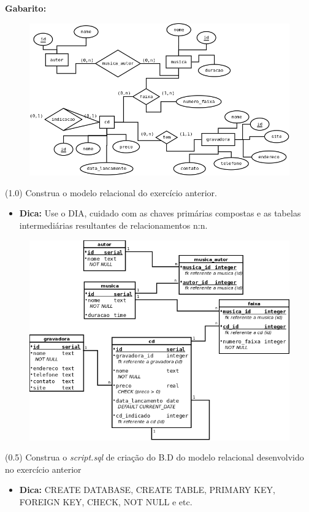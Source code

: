 \documentclass[12pt]{exam}
\begin{document}
\begin{questions}
\textbf{Gabarito:}
\begin{figure}[!htp]
\centering
\includegraphics[width=0.7\linewidth]{figuras/prova-er.png}
\end{figure}

\newpage

\question (1.0) Construa o modelo relacional do exercício anterior.

\begin{itemize}
    \item \textbf{Dica:} Use o DIA, cuidado com as chaves primárias compostas e as tabelas intermediárias resultantes de relacionamentos n:n.
\end{itemize}

\begin{figure}[!htp]
\centering
\includegraphics[width=1\linewidth]{figuras/prova-modelo-relacional.png}
\end{figure}

\question (0.5) Construa o \textit{script.sql} de criação do B.D do modelo relacional desenvolvido no exercício anterior 
\begin{itemize}
    \item \textbf{Dica:} CREATE DATABASE, CREATE TABLE, PRIMARY KEY, FOREIGN KEY, CHECK, NOT NULL e etc.
\end{itemize}


\end{questions}
\end{document}
